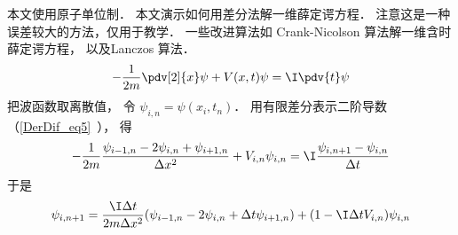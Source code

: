 
\begin{issues}
\issueDraft
\end{issues}


本文使用原子单位制． 本文演示如何用差分法解一维薛定谔方程． 注意这是一种误差较大的方法，仅用于教学． 一些改进算法如 Crank-Nicolson 算法解一维含时薛定谔方程， 以及Lanczos 算法．
\begin{equation}
-\frac{1}{2m}\pdv[2]{x}\psi + V(x,t)\psi = \I\pdv{t}\psi
\end{equation}
把波函数取离散值， 令 $\psi_{i,n} = \psi(x_i,t_n)$． 用有限差分表示二阶导数（\autoref{DerDif_eq5}~）， 得
\begin{equation}
-\frac{1}{2m}\frac{\psi_{i-1,n} - 2\psi_{i,n} + \psi_{i+1,n}}{\Delta x^2} + V_{i,n}\psi_{i,n} = \I \frac{\psi_{i, n+1} - \psi_{i, n}}{\Delta t}
\end{equation}
于是
\begin{equation}
\psi_{i, n+1} = \frac{\I\Delta t}{2m\Delta x^2} (\psi_{i-1,n} - 2\psi_{i,n} + \Delta t\psi_{i+1,n}) + (1-\I \Delta t V_{i,n})\psi_{i,n}
\end{equation}
